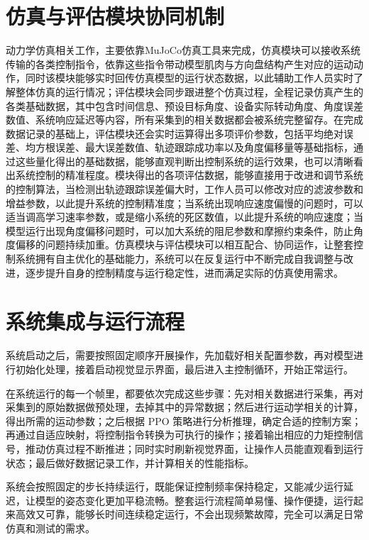 \section{仿真与评估模块协同机制}
动力学仿真相关工作，主要依靠MuJoCo仿真工具来完成，仿真模块可以接收系统传输的各类控制指令，依靠这些指令带动模型肌肉与方向盘结构产生对应的运动动作，同时该模块能够实时回传仿真模型的运行状态数据，以此辅助工作人员实时了解整体仿真的运行情况\cite{zhang2026rengong}；评估模块会同步跟进整个仿真过程，全程记录仿真产生的各类基础数据，其中包含时间信息、预设目标角度、设备实际转动角度、角度误差数值、系统响应延迟等内容，所有采集到的相关数据都会被系统完整留存。在完成数据记录的基础上，评估模块还会实时运算得出多项评价参数，包括平均绝对误差、均方根误差、最大误差数值、轨迹跟踪成功率以及角度偏移量等基础指标，通过这些量化得出的基础数据，能够直观判断出控制系统的运行效果，也可以清晰看出系统控制的精准程度。模块得出的各项评估数据，能够直接用于改进和调节系统的控制算法，当检测出轨迹跟踪误差偏大时，工作人员可以修改对应的滤波参数和增益参数，以此提升系统的控制精准度；当系统出现响应速度偏慢的问题时，可以适当调高学习速率参数，或是缩小系统的死区数值，以此提升系统的响应速度；当模型运行出现角度偏移问题时，可以加大系统的阻尼参数和摩擦约束条件，防止角度偏移的问题持续加重。仿真模块与评估模块可以相互配合、协同运作，让整套控制系统拥有自主优化的基础能力，系统可以在反复运行中不断完成自我调整与改进，逐步提升自身的控制精度与运行稳定性，进而满足实际的仿真使用需求。
\section{系统集成与运行流程}
系统启动之后，需要按照固定顺序开展操作，先加载好相关配置参数，再对模型进行初始化处理，接着启动视觉显示界面，最后进入主控制循环，开始正常运行。

在系统运行的每一个帧里，都要依次完成这些步骤：先对相关数据进行采集，再对采集到的原始数据做预处理，去掉其中的异常数据；然后进行运动学相关的计算，得出所需的运动参数；之后根据 PPO 策略进行分析推理，确定合适的控制方案；再通过自适应映射，将控制指令转换为可执行的操作；接着输出相应的力矩控制信号，推动仿真过程不断推进；同时实时刷新视觉界面，让操作人员能直观看到运行状态；最后做好数据记录工作，并计算相关的性能指标。

系统会按照固定的步长持续运行，既能保证控制频率保持稳定，又能减少运行延迟，让模型的姿态变化更加平稳流畅。整套运行流程简单易懂、操作便捷，运行起来高效又可靠，能够长时间连续稳定运行，不会出现频繁故障，完全可以满足日常仿真和测试的需求。
